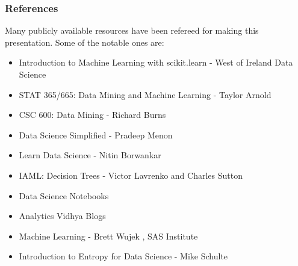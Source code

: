 %
%

\begin{frame}\frametitle{References}

Many publicly available resources have been refereed for making this presentation. Some of the notable ones are:
\footnotesize
\begin{itemize}
\item Introduction to Machine Learning with scikit.learn - West of Ireland Data Science
\item STAT 365/665: Data Mining and Machine Learning - Taylor Arnold
\item CSC 600: Data Mining - Richard Burns
\item Data Science Simplified - Pradeep Menon %
\item Learn Data Science - Nitin Borwankar %
\item IAML: Decision Trees	- Victor Lavrenko and Charles Sutton	
\item Data Science Notebooks %
\item Analytics Vidhya Blogs %
\item Machine Learning - Brett Wujek , SAS Institute
\item Introduction to Entropy for Data Science - Mike Schulte
\end{itemize}
\end{frame}

